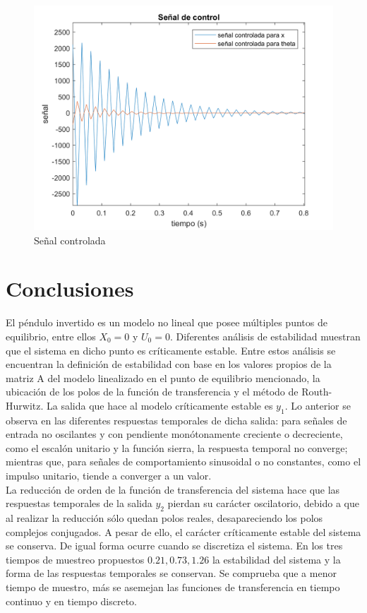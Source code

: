 \documentclass[journal]{IEEEtran}
\begin{document}
\begin{figure}[!h]
\caption{Señal controlada\label{fig:senald}}
  \centering
\includegraphics[scale=0.18]{Bode/senalz.png}
\end{figure}




\section{Conclusiones}
El péndulo invertido es un modelo no lineal que posee múltiples puntos de equilibrio, entre ellos $X_0=0$ y $U_0=0$. Diferentes análisis de estabilidad muestran que el sistema en dicho punto es críticamente estable. Entre estos análisis se encuentran la definición de estabilidad con base en los valores propios de la matriz A del modelo linealizado en el punto de equilibrio mencionado, la ubicación de los polos de la función de transferencia y el método de Routh-Hurwitz. La salida que hace al modelo críticamente estable es $y_1$. Lo anterior se observa en las diferentes respuestas temporales de dicha salida: para señales de entrada no oscilantes y con pendiente monótonamente creciente o decreciente, como el escalón unitario y la función sierra, la respuesta temporal no converge; mientras que, para señales de comportamiento sinusoidal o no constantes, como el impulso unitario, tiende a converger a un valor.\\

La reducción de orden de la función de transferencia del sistema hace que las respuestas temporales de la salida $y_2$ pierdan su carácter oscilatorio, debido a que al realizar la reducción sólo quedan polos reales, desapareciendo los polos complejos conjugados. A pesar de ello, el carácter críticamente estable del sistema se conserva. De igual forma ocurre cuando se discretiza el sistema. En los tres tiempos de muestreo propuestos $0.21, 0.73,1.26$ la estabilidad del sistema y la forma de las respuestas temporales se conservan. Se comprueba que a menor tiempo de muestro, más se asemejan las funciones de transferencia en tiempo continuo y en tiempo discreto.\\
\end{document}
